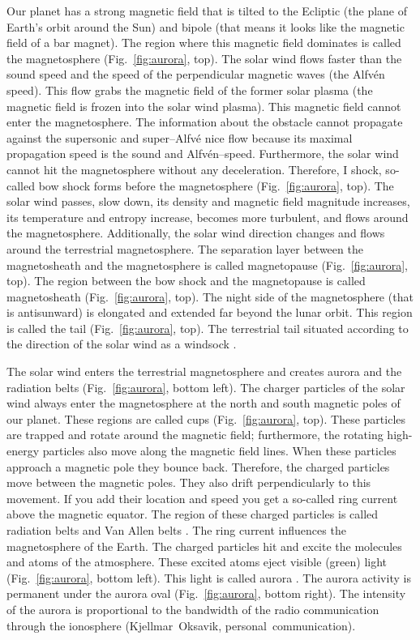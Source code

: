 \documentclass[sn-aps]{sn-jnl}%
\begin{document}
Our planet has a strong magnetic field that is tilted to the Ecliptic (the plane of Earth's orbit around the Sun) and bipole (that means it looks like the magnetic field of a bar magnet). The region where this magnetic field dominates is called the magnetosphere (Fig.~\ref{fig:aurora}, top). The solar wind flows faster than the sound speed and the speed of the perpendicular magnetic waves (the Alfv{\'e}n speed). This flow grabs the magnetic field of the former solar plasma (the magnetic field is frozen into the solar wind plasma). This magnetic field cannot enter the magnetosphere. The information about the obstacle cannot propagate against the supersonic and super--Alfv{\'e} nice flow because its maximal propagation speed is the sound and Alfv{\'e}n--speed. Furthermore, the solar wind cannot hit the magnetosphere without any deceleration. Therefore, I shock, so-called bow shock forms before the magnetosphere (Fig.~\ref{fig:aurora}, top). The solar wind passes, slow down, its density and magnetic field magnitude increases, its temperature and entropy increase, becomes more turbulent, and flows around the magnetosphere. Additionally, the solar wind direction changes and flows around the terrestrial magnetosphere. The separation layer between the magnetosheath and the magnetosphere is called magnetopause (Fig.~\ref{fig:aurora}, top). The region between the bow shock and the magnetopause is called magnetosheath (Fig.~\ref{fig:aurora}, top). The night side of the magnetosphere (that is antisunward) is elongated and extended far beyond the lunar orbit. This region is called the tail (Fig.~\ref{fig:aurora}, top). The terrestrial tail situated according to the direction of the solar wind as a windsock \cite{scherer05:_space_weath,voeroes14:_winds_condit_ram_co_ram,shang20:_unusual_locat_geotail_magnet_near_lunar_orbit}. 

The solar wind enters the terrestrial magnetosphere and creates aurora and the radiation belts (Fig.~\ref{fig:aurora}, bottom left). The charger particles of the solar wind always enter the magnetosphere at the north and south magnetic poles of our planet. These regions are called cups (Fig.~\ref{fig:aurora}, top). These particles are trapped and rotate around the magnetic field; furthermore, the rotating high-energy particles also move along the magnetic field lines. When these particles approach a magnetic pole they bounce back. Therefore, the charged particles move between the magnetic poles. They also drift perpendicularly to this movement. If you add their location and speed you get a so-called ring current above the magnetic equator. The region of these charged particles is called radiation belts and Van Allen belts \cite{scherer05:_space_weath}. The ring current influences the magnetosphere of the Earth. The charged particles hit and excite the molecules and atoms of the atmosphere. These excited atoms eject visible (green) light (Fig.~\ref{fig:aurora}, bottom left). This light is called aurora \cite{scherer05:_space_weath}. The aurora activity is permanent under the aurora oval (Fig.~\ref{fig:aurora}, bottom right). The intensity of the aurora is proportional to the bandwidth of the radio communication through the ionosphere (Kjellmar~Oksavik, personal~communication).
\end{document}
